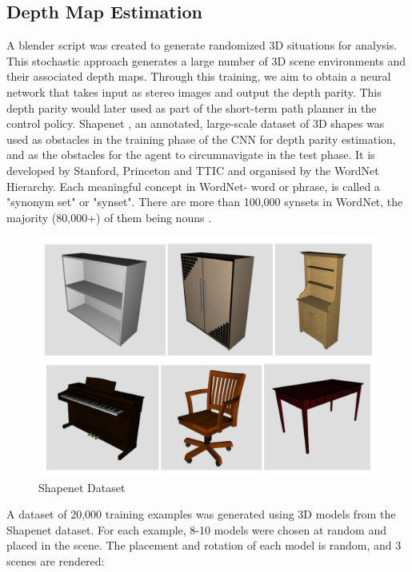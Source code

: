 \subsection{Depth Map Estimation}
A blender script was created to generate randomized 3D situations for analysis. This stochastic approach generates a large number of 3D scene environments and their associated depth maps.
Through this training, we aim to obtain a neural network that takes input as stereo images and output the depth parity. This depth parity would later used as part of the short-term path planner in the control policy.
Shapenet \cite{shapenet2015}, an annotated, large-scale dataset of 3D shapes was used as obstacles in the training phase of the CNN for depth parity estimation, and as the obstacles for the agent to circumnavigate in the test phase. It is developed by Stanford, Princeton and TTIC and organised by the WordNet Hierarchy.
Each meaningful concept in WordNet- word or phrase, is called a "synonym set" or "synset". There are more than 100,000 synsets in WordNet, the majority (80,000+) of them being nouns .

\begin{figure}
  \includegraphics[width=\linewidth]{images/shapenet.png}
  \caption{Shapenet Dataset}
  \label{fig:boat1}
\end{figure}

A dataset of 20,000 training examples was generated using 3D models from the Shapenet dataset. For each example, 8-10 models were chosen at random and placed in the scene.
The placement and rotation of each model is random, and 3 scenes are rendered:

